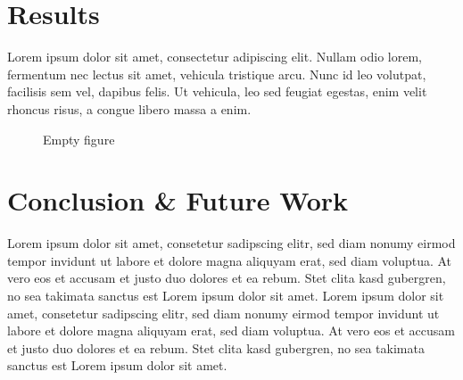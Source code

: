 \documentclass[11pt,a4paper,twoside,openright]{report}
\begin{document}
\chapter{Results}
\label{sec:results}

Lorem ipsum dolor sit amet, consectetur adipiscing elit. Nullam odio lorem, fermentum nec lectus sit amet, vehicula tristique arcu. Nunc id leo volutpat, facilisis sem vel, dapibus felis. Ut vehicula, leo sed feugiat egestas, enim velit rhoncus risus, a congue libero massa a enim.

\begin{figure}
\caption{Empty figure}
\end{figure}

\chapter{Conclusion \& Future Work}
\label{sec:concl}

Lorem ipsum dolor sit amet, consetetur sadipscing elitr, sed diam nonumy
eirmod tempor invidunt ut labore et dolore magna aliquyam erat, sed diam voluptua. At
vero eos et accusam et justo duo dolores et ea rebum. Stet clita kasd gubergren, no sea
takimata sanctus est Lorem ipsum dolor sit amet. Lorem ipsum dolor sit amet, consetetur
sadipscing elitr, sed diam nonumy eirmod tempor invidunt ut labore et dolore magna
aliquyam erat, sed diam voluptua. At vero eos et accusam et justo duo dolores et ea
rebum. Stet clita kasd gubergren, no sea takimata sanctus est Lorem ipsum dolor sit amet.






\end{document}
